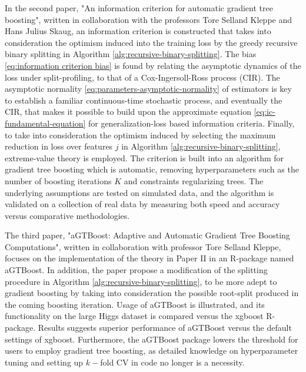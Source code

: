 In the second paper, "An information criterion for automatic gradient tree boosting", written in collaboration with the professors Tore Selland Kleppe and Hans Julius Skaug, an information criterion is constructed that takes into consideration the optimism induced into the training loss by the greedy recursive binary splitting in Algorithm \ref{alg:recursive-binary-splitting}.
The bias \eqref{eq:information criterion bias} is found by relating the asymptotic dynamics of the loss under split-profiling, to that of a Cox-Ingersoll-Ross process (CIR).
The asymptotic normality \eqref{eq:parameters-asymptotic-normality} of estimators is key to establish a familiar continuous-time stochastic process, and eventually the CIR, that makes it possible to build upon the approximate equation \eqref{eq:ic-fundamental-equation} for generalization-loss based information criteria.
Finally, to take into consideration the optimism induced by selecting the maximum reduction in loss over features $j$ in Algorithm \ref{alg:recursive-binary-splitting}, extreme-value theory is employed.
The criterion is built into an algorithm for gradient tree boosting which is automatic, removing hyperparameters such as the number of boosting iterations $K$ and constraints regularizing trees.
The underlying assumptions are tested on simulated data, and the algorithm is validated on a collection of real data by measuring both speed and accuracy versus comparative methodologies.


The third paper, "aGTBoost: Adaptive and Automatic Gradient Tree Boosting Computations", written in collaboration with professor Tore Selland Kleppe, focuses
on the implementation of the theory in Paper II in an R-package named aGTBoost. 
In addition, the paper propose a modification of the splitting procedure in Algorithm \ref{alg:recursive-binary-splitting}, to be more adept to gradient boosting by taking into consideration the possible root-split produced in the coming boosting iteration.
Usage of aGTBoost is illustrated, and its functionality on the large Higgs dataset is compared versus the xgboost R-package.
Results suggests superior performance of aGTBoost versus the default settings of xgboost.
Furthermore, the aGTBoost package lowers the threshold for users to employ gradient tree boosting, as detailed knowledge on hyperparameter tuning and setting up $k-$fold CV in code no longer is a necessity.


